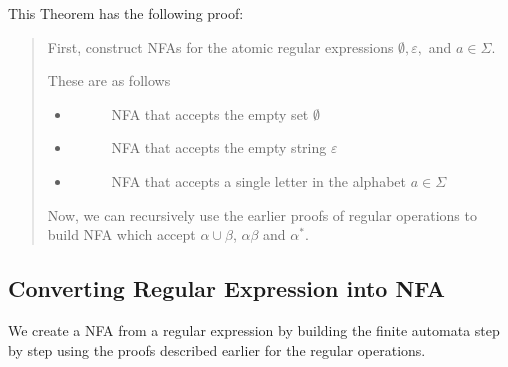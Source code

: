 \documentclass[11pt]{article}
\begin{document}
This Theorem has the following proof:
\begin{quote}
	First, construct NFAs for the atomic regular expressions $\emptyset,
		\varepsilon,$ and $a \in \Sigma$.

	These are as follows
	\begin{itemize}
		\item[]
		      \begin{figure}[H]
			      \centering
			      \caption{NFA that accepts the empty set $\emptyset$}
			      \label{fig:emptyset}
		      \end{figure}
		\item[]
		      \begin{figure}[H]
			      \centering
			      \caption{NFA that accepts the empty string $\varepsilon$}
			      \label{fig:emptystring}
		      \end{figure}
		\item[]
		      \begin{figure}[H]
			      \centering
			      \caption{NFA that accepts a single letter in the alphabet $a \in \Sigma$}
			      \label{fig:ainsigma}
		      \end{figure}
	\end{itemize}
	Now, we can recursively use the earlier proofs of regular operations to build
	NFA which accept $\alpha \cup \beta$, $\alpha\beta$ and $\alpha^\ast$.
\end{quote}

\subsection{Converting Regular Expression into NFA}
We create a NFA from a regular expression by building the finite automata step
by step using the proofs described earlier for the regular operations.
\end{document}
